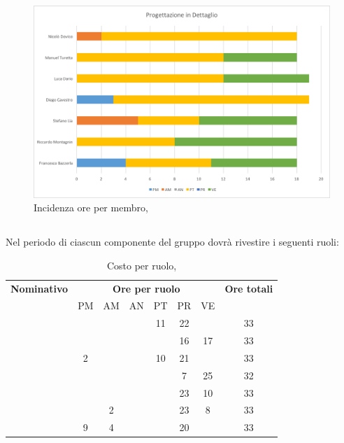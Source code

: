 \begin{figure}[H]
	\centering 
	\includegraphics[scale=0.7]{Immagini/GraficiPianoLavoro/PD.png}
	\caption{Incidenza ore per membro, \PD}
\end{figure}

\newpage
\subsection{\COD}
Nel periodo di \COD ciascun componente del gruppo dovrà rivestire i seguenti ruoli:

\begin{table}[h]
	\begin{center}
		\begin{tabular}{|c|c|c|c|c|c|c|c|}
			\hline
			\textbf{Nominativo} & \multicolumn{6}{c|}{\textbf{Ore per ruolo}} & \textbf{Ore totali} \\
					& PM & AM & AN & PT & PR & VE & \\
			\hline
			\FB		&	 &	  &	   & 11	& 22 &	  &	33	\\
			\hline
			\RM		&	 &	  &	   & 	& 16 & 17 & 33	\\
			\hline
			\SL		& 2  &	  &	   & 10	& 21 &    &	33	\\
			\hline
			\DC		&	 &	  &	   &	& 7	 & 25 &	32	\\
			\hline
			\LD 	&	 &	  &	   &	& 23 & 10 &	33	\\
			\hline
			\MT		& 	 & 2  &	   &	& 23 & 8  &	33	\\
			\hline
			\ND 	& 9	 & 4  &	   &	& 20 &    & 33	\\
			\hline
		\end{tabular}
	\end{center}
	\caption{Costo per ruolo, \COD}
\end{table}


